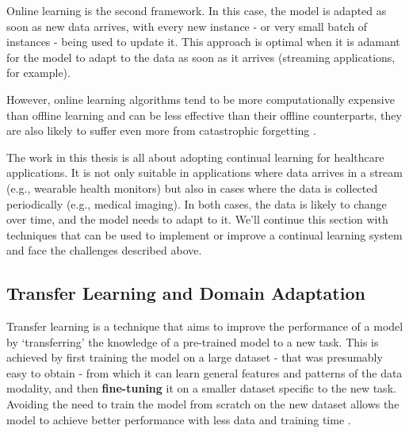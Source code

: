 \documentclass[../main.tex]{subfiles}
\begin{document}


   Online learning is the second framework. In this case, the model is adapted as soon as new data arrives, with every new instance - or very small batch of instances - being used to update it. This approach is optimal when it is adamant for the model to adapt to the data as soon as it arrives (streaming applications, for example). 
   
   However, online learning algorithms tend to be more computationally expensive than offline learning and can be less effective than their offline counterparts, they are also likely to suffer even more from catastrophic forgetting \cite{huyen_designing_2022}.

   The work in this thesis is all about adopting continual learning for healthcare applications. It is not only suitable in applications where data arrives in a stream (e.g., wearable health monitors) but also in cases where the data is collected periodically (e.g., medical imaging). In both cases, the data is likely to change over time, and the model needs to adapt to it. We'll continue this section with techniques that can be used to implement or improve a continual learning system and face the challenges described above.

    \subsection{Transfer Learning and Domain Adaptation} \label{sec:transfer_learning} 

    Transfer learning is a technique that aims to improve the performance of a model by `transferring' the knowledge of a pre-trained model to a new task. This is achieved by first training the model on a large dataset - that was presumably easy to obtain - from which it can learn general features and patterns of the data modality, and then \textbf{fine-tuning} it on a smaller dataset specific to the new task. Avoiding the need to train the model from scratch on the new dataset allows the model to achieve better performance with less data and training time \cite{panSurveyTransferLearning2010}.
\end{document}

